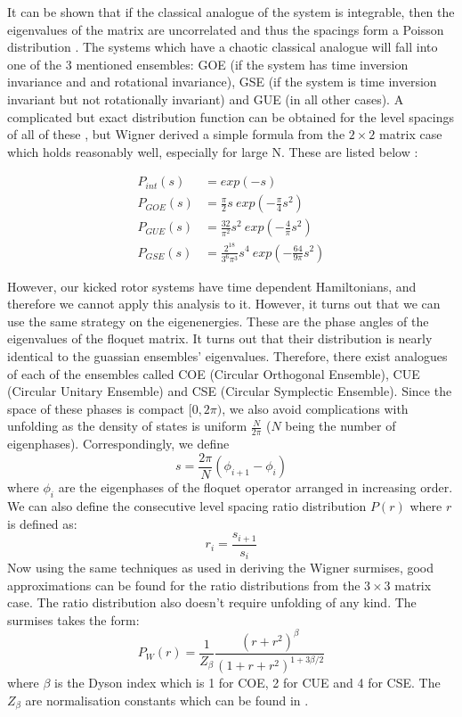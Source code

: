 \documentclass[twocolumn]{report}
\begin{document}
It can be shown that if the classical analogue of the system is integrable,
then the eigenvalues of the matrix are uncorrelated and thus the spacings
form a Poisson distribution \cite{stockmann}\cite{mehta_random_2004}. The
systems which have a chaotic classical analogue will fall into one of the 3
mentioned ensembles: GOE (if the system has time inversion invariance and
and rotational invariance), GSE (if the system is time inversion invariant
but not rotationally invariant) and GUE (in all other cases). A complicated
but exact distribution function can be obtained for the level spacings of
all of these \cite{mehta_random_2004}, but Wigner derived a simple formula
from the $2 \times 2$ matrix case which holds reasonably well, especially
for large N. These are listed below \cite{stockmann}:

\begin{align}
    P_{int}(s) &= exp(-s)\\
    P_{GOE}(s) &= \frac{\pi}{2} s\ exp\left(-\frac{\pi}{4}s^2\right)\\
    P_{GUE}(s) &= \frac{32}{\pi^2} s^2\ exp\left(-\frac{4}{\pi}s^2\right)\\
    P_{GSE}(s) &= \frac{2^{18}}{3^6 \pi^3} s^4\ exp\left(-\frac{64}{9\pi}s^2\right)
\end{align}

However, our kicked rotor systems have time dependent Hamiltonians, and
therefore we cannot apply this analysis to it. However, it turns out that
we can use the same strategy on the eigenenergies. These are the phase
angles of the eigenvalues of the floquet matrix. It turns out that their
distribution is nearly identical to the guassian ensembles' eigenvalues.
Therefore, there exist analogues of each of the ensembles called COE
(Circular Orthogonal Ensemble), CUE (Circular Unitary Ensemble) and
CSE (Circular Symplectic Ensemble). Since the space of these phases is
compact $[0, 2\pi)$, we also avoid complications with unfolding as the
density of states is uniform $\frac{N}{2\pi}$ ($N$ being the number
of eigenphases). Correspondingly, we define
\begin{equation}
    s = \frac{2\pi}{N} (\phi_{i+1} - \phi_i)
\end{equation}
where $\phi_i$ are the eigenphases of the floquet operator arranged in
increasing order. We can also define the consecutive level spacing ratio
distribution $P(r)$ where $r$ is defined as:
\begin{equation}
    r_i = \frac{s_{i+1}}{s_i}
\end{equation}
Now using the same techniques as used in deriving the Wigner surmises,
good approximations can be found for the ratio distributions from the
$3 \times 3$ matrix case. The ratio distribution also doesn't require
unfolding of any kind. The surmises takes the form\cite{atas_distribution_2013}:
\begin{equation}
    P_W(r) = \frac{1}{Z_\beta}
    \frac{(r + r^2)^\beta}{(1 + r + r^2)^{1 + 3\beta/2}}
\end{equation}
where $\beta$ is the Dyson index which is 1 for COE, 2 for CUE and 4
for CSE. The $Z_\beta$ are normalisation constants which can be found
in \cite{atas_distribution_2013}.
\end{document}
